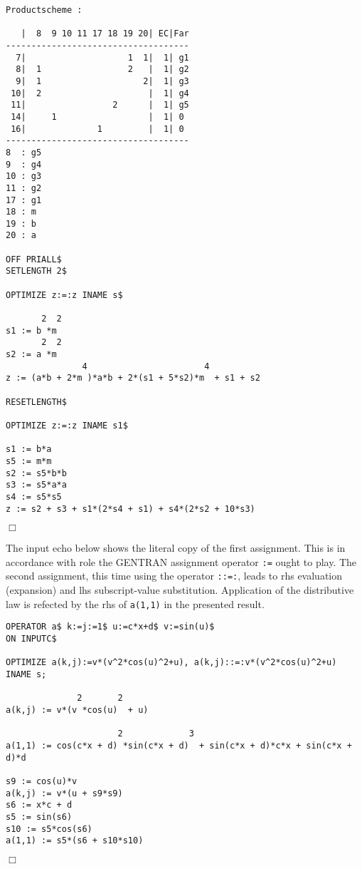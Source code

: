 {\small
\begin{verbatim}
Productscheme :

   |  8  9 10 11 17 18 19 20| EC|Far
------------------------------------
  7|                    1  1|  1| g1
  8|  1                 2   |  1| g2
  9|  1                    2|  1| g3
 10|  2                     |  1| g4
 11|                 2      |  1| g5
 14|     1                  |  1| 0
 16|              1         |  1| 0
------------------------------------
8  : g5
9  : g4
10 : g3
11 : g2
17 : g1
18 : m
19 : b
20 : a

OFF PRIALL$
SETLENGTH 2$

OPTIMIZE z:=:z INAME s$

       2  2
s1 := b *m
       2  2
s2 := a *m
               4                       4
z := (a*b + 2*m )*a*b + 2*(s1 + 5*s2)*m  + s1 + s2

RESETLENGTH$

OPTIMIZE z:=:z INAME s1$

s1 := b*a
s5 := m*m
s2 := s5*b*b
s3 := s5*a*a
s4 := s5*s5
z := s2 + s3 + s1*(2*s4 + s1) + s4*(2*s2 + 10*s3)
\end{verbatim}
\begin{flushright}
$\Box$
\end{flushright}}
\example\label{ex:3.1.3} 

The input echo below shows the literal copy of the first assignment.
This is in accordance with role the GENTRAN assignment operator {\tt :=}
ought to play.  The second assignment, this time using the operator {\tt ::=:},
leads to rhs evaluation (expansion) and lhs subscript-value substitution.
Application of the distributive law is refected by the rhs of {\tt a(1,1)} 
in the presented result.
{\small
\begin{verbatim}
OPERATOR a$ k:=j:=1$ u:=c*x+d$ v:=sin(u)$
ON INPUTC$

OPTIMIZE a(k,j):=v*(v^2*cos(u)^2+u), a(k,j)::=:v*(v^2*cos(u)^2+u) INAME s;

              2       2
a(k,j) := v*(v *cos(u)  + u)

                      2             3
a(1,1) := cos(c*x + d) *sin(c*x + d)  + sin(c*x + d)*c*x + sin(c*x + d)*d

s9 := cos(u)*v
a(k,j) := v*(u + s9*s9)
s6 := x*c + d
s5 := sin(s6)
s10 := s5*cos(s6)
a(1,1) := s5*(s6 + s10*s10)
\end{verbatim}
\begin{flushright}
$\Box$
\end{flushright}}
\example\label{ex:3.1.4}

